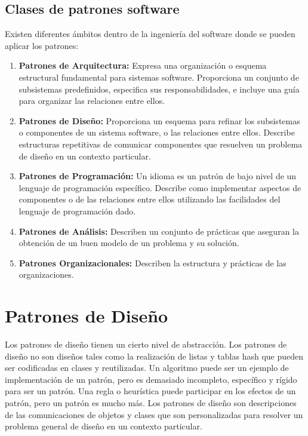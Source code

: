  \subsection{Clases de patrones software}
  Existen diferentes ámbitos dentro de la ingeniería del software donde se pueden aplicar los patrones:
  \begin{enumerate}
  	\item \textbf{Patrones de Arquitectura:} Expresa una organización o esquema estructural fundamental para sistemas software. Proporciona un conjunto de subsistemas predefinidos, especifica sus responsabilidades, e incluye una guía para organizar las relaciones entre ellos.
  	\item \textbf{Patrones de Diseño:} Proporciona un esquema para refinar los subsistemas o componentes de un sistema software, o las relaciones entre ellos. Describe
  	estructuras repetitivas de comunicar componentes que resuelven un problema de diseño en un contexto particular.
  	\item \textbf{Patrones de Programación:} Un idioma es un patrón de bajo nivel de un lenguaje de programación específico. Describe como implementar aspectos de componentes o de las relaciones entre ellos utilizando las facilidades del lenguaje de programación dado.
  	\item \textbf{Patrones de Análisis:} Describen un conjunto de prácticas que aseguran la obtención de un buen modelo de un problema y su solución.
  	\item \textbf{Patrones Organizacionales:} Describen la estructura y prácticas de las organizaciones.
  \end{enumerate}
  
  \section{Patrones de Diseño}
  Los patrones de diseño tienen un cierto nivel de abstracción. Los patrones de diseño no son
  diseños tales como la realización de listas y tablas hash que pueden ser codificadas en clases y reutilizadas. Un algoritmo puede ser un ejemplo de implementación de un patrón, pero es demasiado incompleto, específico y rígido para ser un patrón. Una regla o heurística puede
  participar en los efectos de un patrón, pero un patrón es mucho más. Los patrones de diseño
  son descripciones de las comunicaciones de objetos y clases que son personalizadas para
  resolver un problema general de diseño en un contexto particular. \\
  

